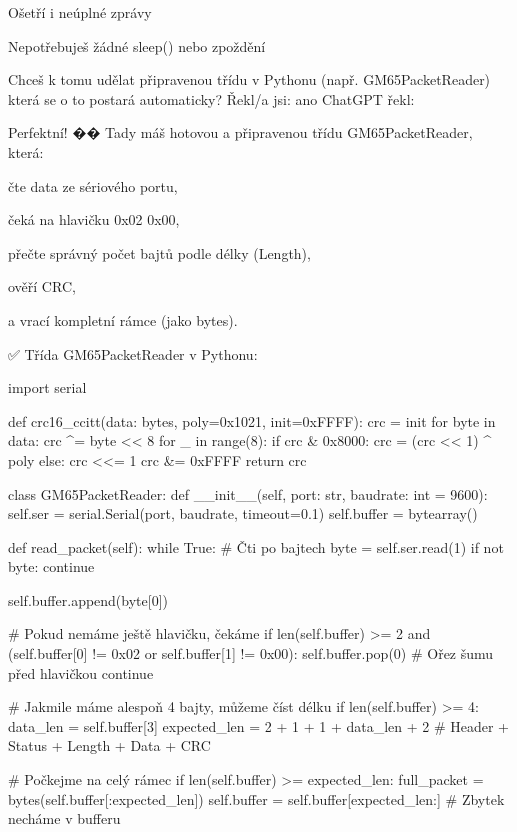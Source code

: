    Ošetří i neúplné zprávy

    Nepotřebuješ žádné sleep() nebo zpoždění

Chceš k tomu udělat připravenou třídu v Pythonu (např. GM65PacketReader) která se o to postará automaticky?
Řekl/a jsi:
ano
ChatGPT řekl:

Perfektní! �� Tady máš hotovou a připravenou třídu GM65PacketReader, která:

    čte data ze sériového portu,

    čeká na hlavičku 0x02 0x00,

    přečte správný počet bajtů podle délky (Length),

    ověří CRC,

    a vrací kompletní rámce (jako bytes).

✅ Třída GM65PacketReader v Pythonu:

import serial

def crc16_ccitt(data: bytes, poly=0x1021, init=0xFFFF):
    crc = init
    for byte in data:
        crc ^= byte << 8
        for _ in range(8):
            if crc & 0x8000:
                crc = (crc << 1) ^ poly
            else:
                crc <<= 1
            crc &= 0xFFFF
    return crc

class GM65PacketReader:
    def __init__(self, port: str, baudrate: int = 9600):
        self.ser = serial.Serial(port, baudrate, timeout=0.1)
        self.buffer = bytearray()

    def read_packet(self):
        while True:
            # Čti po bajtech
            byte = self.ser.read(1)
            if not byte:
                continue

            self.buffer.append(byte[0])

            # Pokud nemáme ještě hlavičku, čekáme
            if len(self.buffer) >= 2 and (self.buffer[0] != 0x02 or self.buffer[1] != 0x00):
                self.buffer.pop(0)  # Ořez šumu před hlavičkou
                continue

            # Jakmile máme alespoň 4 bajty, můžeme číst délku
            if len(self.buffer) >= 4:
                data_len = self.buffer[3]
                expected_len = 2 + 1 + 1 + data_len + 2  # Header + Status + Length + Data + CRC

                # Počkejme na celý rámec
                if len(self.buffer) >= expected_len:
                    full_packet = bytes(self.buffer[:expected_len])
                    self.buffer = self.buffer[expected_len:]  # Zbytek necháme v bufferu

